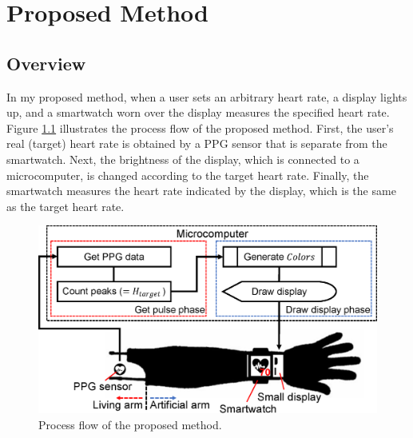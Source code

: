 \chapter{Proposed Method}
\label{sec:method}

\section{Overview}
In my proposed method, when a user sets an arbitrary heart rate, a display lights up, and a smartwatch worn over the display measures the specified heart rate. Figure \ref{fig:method} illustrates the process flow of the proposed method. First, the user's real (target) heart rate is obtained by a PPG sensor that is separate from the smartwatch. Next, the brightness of the display, which is connected to a microcomputer, is changed according to the target heart rate. Finally, the smartwatch measures the heart rate indicated by the display, which is the same as the target heart rate.

\begin{figure}[!t]
  \centering
  \includegraphics[width=1\linewidth]{figures/method.eps}
  \caption{Process flow of the proposed method.}
  \label{fig:method}
\end{figure}


